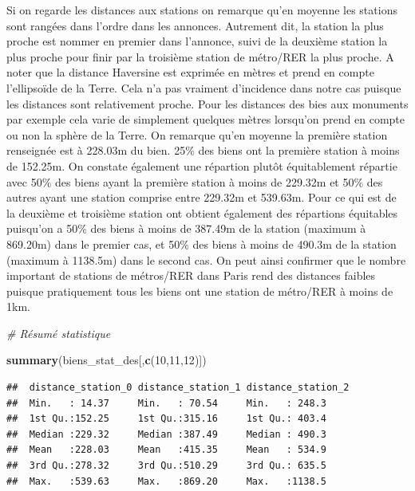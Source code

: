 \documentclass[french,]{article}
\newenvironment{Shaded}{\begin{snugshade}}{\end{snugshade}}
\newcommand{\CommentTok}[1]{\textcolor[rgb]{0.56,0.35,0.01}{\textit{#1}}}
\newcommand{\DecValTok}[1]{\textcolor[rgb]{0.00,0.00,0.81}{#1}}
\newcommand{\KeywordTok}[1]{\textcolor[rgb]{0.13,0.29,0.53}{\textbf{#1}}}
\newcommand{\NormalTok}[1]{#1}
\begin{document}
Si on regarde les distances aux stations on remarque qu'en moyenne les
stations sont rangées dans l'ordre dans les annonces. Autrement dit, la
station la plus proche est nommer en premier dans l'annonce, suivi de la
deuxième station la plus proche pour finir par la troisième station de
métro/RER la plus proche. A noter que la distance Haversine est exprimée
en mètres et prend en compte l'ellipsoïde de la Terre. Cela n'a pas
vraiment d'incidence dans notre cas puisque les distances sont
relativement proche. Pour les distances des bies aux monuments par
exemple cela varie de simplement quelques mètres lorsqu'on prend en
compte ou non la sphère de la Terre. On remarque qu'en moyenne la
première station renseignée est à 228.03m du bien. 25\% des biens ont la
première station à moins de 152.25m. On constate également une répartion
plutôt équitablement répartie avec 50\% des biens ayant la première
station à moins de 229.32m et 50\% des autres ayant une station comprise
entre 229.32m et 539.63m. Pour ce qui est de la deuxième et troisième
station ont obtient également des répartions équitables puisqu'on a 50\%
des biens à moins de 387.49m de la station (maximum à 869.20m) dans le
premier cas, et 50\% des biens à moins de 490.3m de la station (maximum
à 1138.5m) dans le second cas. On peut ainsi confirmer que le nombre
important de stations de métros/RER dans Paris rend des distances
faibles puisque pratiquement tous les biens ont une station de métro/RER
à moins de 1km.

\begin{Shaded}
\begin{Highlighting}[]
\CommentTok{# Résumé statistique}

\KeywordTok{summary}\NormalTok{(biens_stat_des[,}\KeywordTok{c}\NormalTok{(}\DecValTok{10}\NormalTok{,}\DecValTok{11}\NormalTok{,}\DecValTok{12}\NormalTok{)])}
\end{Highlighting}
\end{Shaded}

\begin{verbatim}
##  distance_station_0 distance_station_1 distance_station_2
##  Min.   : 14.37     Min.   : 70.54     Min.   : 248.3    
##  1st Qu.:152.25     1st Qu.:315.16     1st Qu.: 403.4    
##  Median :229.32     Median :387.49     Median : 490.3    
##  Mean   :228.03     Mean   :415.35     Mean   : 534.9    
##  3rd Qu.:278.32     3rd Qu.:510.29     3rd Qu.: 635.5    
##  Max.   :539.63     Max.   :869.20     Max.   :1138.5
\end{verbatim}
\end{document}
